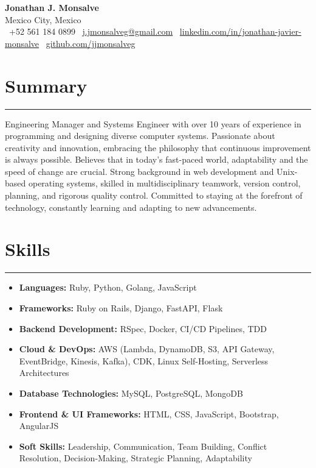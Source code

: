 \documentclass[a4paper,10pt]{article}
\begin{document}
\begin{center}
    \textbf{\LARGE Jonathan J. Monsalve} \\[0.5em]
    Mexico City, Mexico \\
    \faPhone \ +52 561 184 0899 \hspace{1em}
    \faEnvelope \ \href{mailto:j.jmonsalveg@gmail.com}{j.jmonsalveg@gmail.com} \hspace{1em}
    \faLinkedin \ \href{http://linkedin.com/in/jonathan-javier-monsalve}{linkedin.com/in/jonathan-javier-monsalve} \hspace{1em}
    \faGithub \ \href{https://github.com/jjmonsalveg}{github.com/jjmonsalveg}
\end{center}

\vspace{0.5em}

\newcommand{\sectionline}{
    \noindent\rule{\linewidth}{0.4pt}\vspace{0.1em}
}

\section*{Summary}
\sectionline
Engineering Manager and Systems Engineer with over 10 years of experience in programming and designing diverse computer systems. Passionate about creativity and innovation, embracing the philosophy that continuous improvement is always possible. Believes that in today's fast-paced world, adaptability and the speed of change are crucial. Strong background in web development and Unix-based operating systems, skilled in multidisciplinary teamwork, version control, planning, and rigorous quality control. Committed to staying at the forefront of technology, constantly learning and adapting to new advancements.

\section*{Skills}
\sectionline
\vspace{-1em}
\begin{itemize}[leftmargin=0.5cm]
    \item \textbf{Languages:} Ruby, Python, Golang, JavaScript
    \item \textbf{Frameworks:} Ruby on Rails, Django, FastAPI, Flask
    \item \textbf{Backend Development:} RSpec, Docker, CI/CD Pipelines, TDD
    \item \textbf{Cloud \& DevOps:} AWS (Lambda, DynamoDB, S3, API Gateway, EventBridge, Kinesis, Kafka), CDK, Linux Self-Hosting, Serverless Architectures
    \item \textbf{Database Technologies:} MySQL, PostgreSQL, MongoDB
    \item \textbf{Frontend \& UI Frameworks:} HTML, CSS, JavaScript, Bootstrap, AngularJS
    \item \textbf{Soft Skills:} Leadership, Communication, Team Building, Conflict Resolution, Decision-Making, Strategic Planning, Adaptability
\end{itemize}
\end{document}
